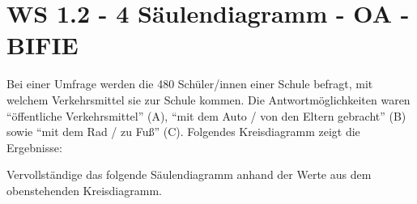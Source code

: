 \section{WS 1.2 - 4 Säulendiagramm - OA - BIFIE}

\begin{beispiel}[WS 1.2]{1} %
				Bei einer Umfrage werden die 480 Schüler/innen einer Schule befragt, mit welchem Verkehrsmittel
sie zur Schule kommen. Die Antwortmöglichkeiten waren "`öffentliche Verkehrsmittel"' (A),
"`mit dem Auto / von den Eltern gebracht"' (B) sowie "`mit dem Rad / zu Fuß"' (C). Folgendes
Kreisdiagramm zeigt die Ergebnisse:\\

\begin{center}
\kreisdiagramm{}
\end{center}


Vervollständige das folgende Säulendiagramm anhand der Werte aus dem obenstehenden Kreisdiagramm.\\


\end{beispiel}

